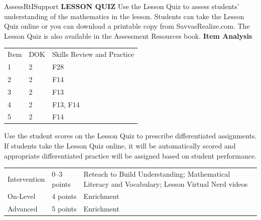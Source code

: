 \documentclass{article}
\newenvironment{te-addendum}[2]{}{}     %
\newcommand{\te}[1]{}                   %
\begin{document}
\begin{te-addendum}{Assess}{RtISupport}
\textbf{LESSON QUIZ}
Use the Lesson Quiz to assess students' understanding of the mathematics in the lesson.
Students can take the Lesson Quiz online or you can download a printable copy from SavvasRealize.com. The Lesson Quiz is also available in the Assessment Resources book.
\textbf{Item Analysis}
\begin{tabular}{lll}
Item & DOK & Skills Review and Practice \\
1 & 2 & F28 \\
2 & 2 & F14 \\
3 & 2 & F13 \\
4 & 2 & F13, F14 \\
5 & 2 & F14 \\
\end{tabular}
Use the student scores on the Lesson Quiz to prescribe differentiated assignments.
If students take the Lesson Quiz online, it will be automatically scored and appropriate differentiated practice will be assigned based on student performance.
\begin{tabular}{lll}
Intervention & 0--3 points & Reteach to Build Understanding; Mathematical Literacy and Vocabulary; Lesson Virtual Nerd videos \\
On-Level & 4 points & Enrichment \\
Advanced & 5 points & Enrichment \\
\end{tabular}
\te{Lesson Quiz is available at SavvasRealize.com. ASSESSMENT RESOURCES.}
\end{te-addendum}
\end{document}
